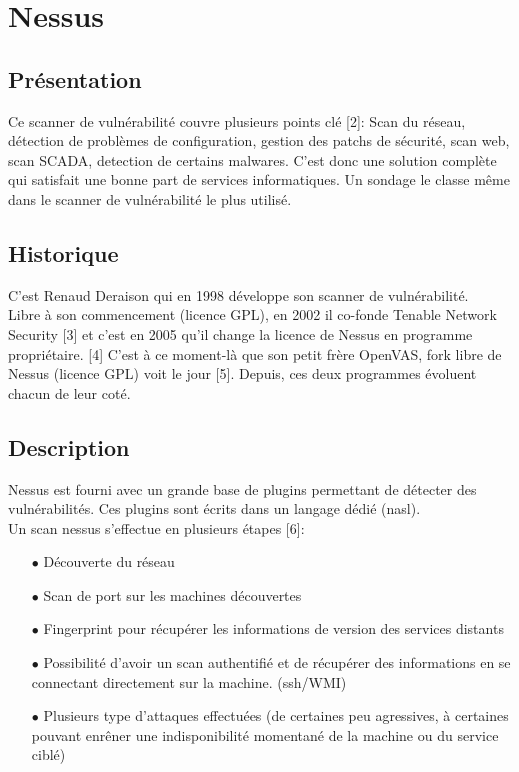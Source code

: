 \section{Nessus}
\thispagestyle{plain}
\subsection{Présentation}
Ce scanner de vulnérabilité couvre plusieurs points clé [2]: Scan du réseau, détection de problèmes de configuration, gestion des patchs de sécurité, scan web, scan SCADA, detection de certains malwares. C’est donc une solution complète qui satisfait une bonne part de services informatiques. Un sondage le classe même dans le scanner de vulnérabilité le plus utilisé.

\subsection{Historique}
C’est Renaud Deraison qui en 1998 développe son scanner de vulnérabilité.\\
Libre à son commencement (licence GPL), en 2002 il co-fonde Tenable Network Security [3] et c’est en 2005 qu’il change la licence de Nessus en programme propriétaire. [4] C’est à ce moment-là que son petit frère OpenVAS, fork libre de Nessus (licence GPL) voit le jour [5]. Depuis, ces deux programmes évoluent chacun de leur coté.

\subsection{Description}
Nessus est fourni avec un grande base de plugins permettant de détecter des vulnérabilités. Ces plugins sont écrits dans un langage dédié (nasl).\\
Un scan nessus s’effectue en plusieurs étapes [6]:\\
\begin{itemize}
\item [$\bullet$]Découverte du réseau\\
\item [$\bullet$]Scan de port sur les machines découvertes\\
\item [$\bullet$]Fingerprint pour récupérer les informations de version des services distants\\
\item [$\bullet$]Possibilité d’avoir un scan authentifié et de récupérer des informations en se connectant directement sur la machine. (ssh/WMI)\\
\item [$\bullet$]Plusieurs type d’attaques effectuées (de certaines peu agressives, à certaines pouvant enrêner une indisponibilité momentané de la machine ou du service ciblé)\\
\end{itemize}

